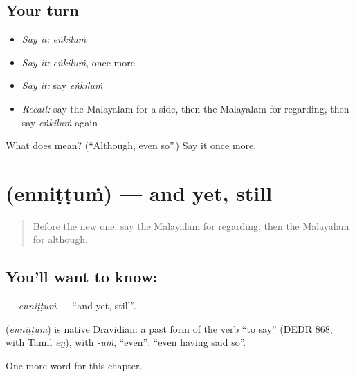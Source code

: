 \subsection*{Your turn}
\begin{itemize}
\raggedright
  \item \emph{Say it:} \emph{eṅkiluṁ}
  \item \emph{Say it:} \emph{eṅkiluṁ}, once more
  \item \emph{Say it:} say \emph{eṅkiluṁ}
  \item \emph{Recall:} say the Malayalam for a side, then the Malayalam for regarding, then say \emph{eṅkiluṁ} again
\end{itemize}

\begin{tcolorbox}[breakable,colback=teal!4,colframe=teal!35!black,title={Before you move on}]
What does  mean? (\textquotedblleft{}Although, even so\textquotedblright{}.) Say it once more.
\end{tcolorbox}
\section[\texorpdfstring{\ml{എന്നിട്ടും} (enniṭṭuṁ)}{എന്നിട്ടും (enniṭṭuṁ)}]{ (enniṭṭuṁ) — and yet, still}

\label{lesson:ML-C241-ennittum}



\begin{quote}
Before the new one: say the Malayalam for regarding, then the Malayalam for although.
\end{quote}

\subsection*{You'll want to know: }
\textbf{} — \emph{enniṭṭuṁ} — \textquotedblleft{}and yet, still\textquotedblright{}.

\begin{cousinweb}
\textbf{} (\emph{enniṭṭuṁ}) is native Dravidian: a past form of the verb \textquotedblleft{}to say\textquotedblright{} (DEDR 868, with Tamil \emph{eṉ}), with \emph{-uṁ}, \textquotedblleft{}even\textquotedblright{}: \textquotedblleft{}even having said so\textquotedblright{}.
\end{cousinweb}

\begin{grammarlens}[title={What you've built}]
One more word for this chapter.
\end{grammarlens}

